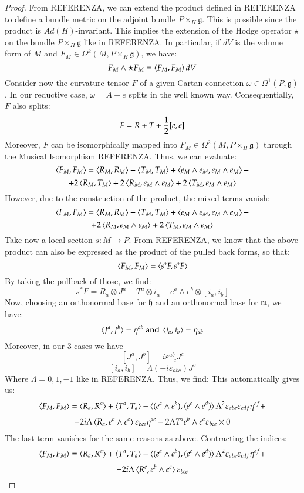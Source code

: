 \documentclass[12pt,a4paper]{report}
\theoremstyle{definition}
\theoremstyle{Theorem}
\theoremstyle{break}
\theoremstyle{definition}
\begin{document}
	\begin{proof}
		From REFERENZA, we can extend the product defined in REFERENZA to define a bundle metric on the adjoint bundle $P\times_H \mathfrak{g}$. This is possible since the product is $Ad(H)$-invariant. This implies the extension of the Hodge operator $\star$ on the bundle $P\times_H \mathfrak{g}$ like in REFERENZA. In particular, if $dV$ is the volume form of $M$ and $F_M\in\Omega^k(M,P\times_H \mathfrak{g})$, we have:
		$$F_M\wedge \star F_M=\braket{F_M,F_M}dV$$ 
		Consider now the curvature tensor $F$ of a given Cartan connection $\omega\in\Omega^1(P,\mathfrak{g})$. In our reductive case, $\omega=A+e$ splits in the well known way. Consequentially, $F$ also splits:
		$$F=R+T+{1\over 2}[e,e]$$
		Moreover, $F$ can be isomorphically mapped into $F_M\in\Omega^2(M,P\times_H\mathfrak{g})$ through the Musical Isomorphism REFERENZA. Thus, we can evaluate:
		$$\braket{F_M,F_M}=\braket{R_M,R_M}+\braket{T_M,T_M}+\braket{e_M\wedge e_M,e_M\wedge e_M}+$$$$+2\braket{R_M,T_M}+2\braket{R_M,e_M\wedge e_M}+2\braket{T_M,e_M\wedge e_M}$$
		However, due to the construction of the product, the mixed terms vanish:
		$$\braket{F_M,F_M}=\braket{R_M,R_M}+\braket{T_M,T_M}+\braket{e_M\wedge e_M,e_M\wedge e_M}+$$$$+2\braket{R_M,e_M\wedge e_M}+2\braket{T_M,e_M\wedge e_M}$$
		Take now a local section $s:M\rightarrow P$. From REFERENZA, we know that the above product can also be expressed as the product of the pulled back forms, so that:
		$$\braket{F_M,F_M}=\braket{s^*F,s^*F}$$
		By taking the pullback of those, we find:
		$$s^*F=R_a\otimes J^a+T^a\otimes i_a+e^a\wedge e^b\otimes [i_a,i_b]$$
		Now, choosing an orthonormal base for $\mathfrak{h}$ and an orthonormal base for $\mathfrak{m}$, we have:
		$$\braket{J^a,J^b}=\eta^{ab}\hbox{ and }\braket{i_a,i_b}=\eta_{ab}$$
		Moreover, in our 3 cases we have 
		$$[J^a,J^b]=i\varepsilon^{ab}_{\hspace{9pt}c}J^c$$
		$$[i_a,i_b]=\Lambda(-i\varepsilon_{abc})J^c$$
		Where $\Lambda=0,1,-1$ like in REFERENZA. Thus, we find:
		This automatically gives us:
		$$\braket{F_M,F_M}=\braket{R_a,R^a}+\braket{T^a,T_a}-\braket{(e^a\wedge e^b),(e^c\wedge e^d)}\Lambda^2\varepsilon_{abe}\varepsilon_{cdf}\eta^{ef}+$$
		$$-2i\Lambda \braket{R_a,e^b\wedge e^c}\varepsilon_{bce}\eta^{ae}-2\Lambda T^a e^b\wedge e^c\varepsilon_{bce}\times 0$$
		The last term vanishes for the same reasons as above. Contracting the indices:
		$$\braket{F_M,F_M}=\braket{R_a,R^a}+\braket{T^a,T_a}-\braket{(e^a\wedge e^b),(e^c\wedge e^d)}\Lambda^2\varepsilon_{abe}\varepsilon_{cdf}\eta^{ef}+$$
		$$-2i\Lambda \braket{R^e,e^b\wedge e^c}\varepsilon_{bce}$$

\end{proof}
\end{document}
